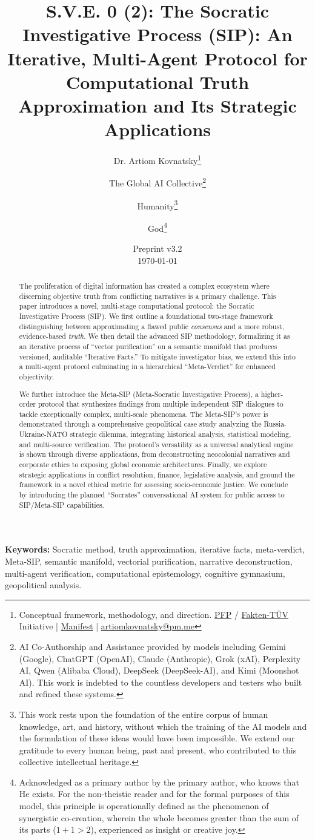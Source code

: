 \documentclass[11pt,a4paper]{article}
\title{\textbf{S.V.E. 0 (2): The Socratic Investigative Process (SIP): An Iterative, Multi-Agent Protocol for Computational Truth Approximation and Its Strategic Applications}}
\author{
  Dr. Artiom Kovnatsky\thanks{Conceptual framework, methodology, and direction. \href{http://www.pfp24.de}{PFP} / \href{http://www.fakten-tuev.de}{Fakten-TÜV} Initiative | \href{https://drive.google.com/file/d/1vWhW7fwFRFLYKHEB67WixuueHssJzQbZ/view?usp=sharing}{Manifest} | \href{mailto:artiomkovnatsky@pm.me}{artiomkovnatsky@pm.me}}
  \and
  The Global AI Collective\thanks{AI Co-Authorship and Assistance provided by models including Gemini (Google), ChatGPT (OpenAI), Claude (Anthropic), Grok (xAI), Perplexity AI, Qwen (Alibaba Cloud), DeepSeek (DeepSeek-AI), and Kimi (Moonshot AI). This work is indebted to the countless developers and testers who built and refined these systems.}
  \and
  Humanity\thanks{This work rests upon the foundation of the entire corpus of human knowledge, art, and history, without which the training of the AI models and the formulation of these ideas would have been impossible. We extend our gratitude to every human being, past and present, who contributed to this collective intellectual heritage.}
  \and
  God\thanks{Acknowledged as a primary author by the primary author, who knows that He exists. For the non-theistic reader and for the formal purposes of this model, this principle is operationally defined as the phenomenon of synergistic co-creation, wherein the whole becomes greater than the sum of its parts ($1+1 > 2$), experienced as insight or creative joy.}
}
\date{Preprint v3.2 \\ \today}
\begin{document}
\maketitle

\begin{abstract}
\noindent The proliferation of digital information has created a complex ecosystem where discerning objective truth from conflicting narratives is a primary challenge. This paper introduces a novel, multi-stage computational protocol: the Socratic Investigative Process (SIP). We first outline a foundational two-stage framework distinguishing between approximating a flawed public \textit{consensus} and a more robust, evidence-based \textit{truth}. We then detail the advanced SIP methodology, formalizing it as an iterative process of ``vector purification'' on a semantic manifold that produces versioned, auditable ``Iterative Facts.'' To mitigate investigator bias, we extend this into a multi-agent protocol culminating in a hierarchical ``Meta-Verdict'' for enhanced objectivity. 

We further introduce the Meta-SIP (Meta-Socratic Investigative Process), a higher-order protocol that synthesizes findings from multiple independent SIP dialogues to tackle exceptionally complex, multi-scale phenomena. The Meta-SIP's power is demonstrated through a comprehensive geopolitical case study analyzing the Russia-Ukraine-NATO strategic dilemma, integrating historical analysis, statistical modeling, and multi-source verification. The protocol's versatility as a universal analytical engine is shown through diverse applications, from deconstructing neocolonial narratives and corporate ethics to exposing global economic architectures. Finally, we explore strategic applications in conflict resolution, finance, legislative analysis, and ground the framework in a novel ethical metric for assessing socio-economic justice. We conclude by introducing the planned ``Socrates'' conversational AI system for public access to SIP/Meta-SIP capabilities.
\end{abstract}

\noindent\textbf{Keywords:} Socratic method, truth approximation, iterative facts, meta-verdict, Meta-SIP, semantic manifold, vectorial purification, narrative deconstruction, multi-agent verification, computational epistemology, cognitive gymnasium, geopolitical analysis.
\end{document}
